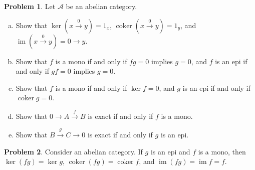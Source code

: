 \documentclass[11pt]{article}
\DeclareMathOperator{\coker}{coker}
\DeclareMathOperator{\im}{im}
\theoremstyle{definition}
\newtheorem{problem}{Problem}
\begin{document}
\vfill

\begin{problem} Let $\mathcal{A}$ be an abelian category.
	\begin{enumerate}[a)]
		\item Show that $\ker(x \xrightarrow{0} y) = 1_x$,  $\coker(x \xrightarrow{0} y) = 1_y$, and $\im(x \xrightarrow{0} y) = 0 \longrightarrow y$.
		\item Show that $f$ is a mono if and only if $fg = 0$ implies $g = 0$, and $f$ is an epi if and only if $gf = 0$ implies $g = 0$.
		\item Show that $f$ is a mono if and only if $\ker f = 0$, and $g$ is an epi if and only if $\coker g = 0$.
		\item Show that $0 \longrightarrow A \xrightarrow{\, f \,} B$ is exact if and only if $f$ is a mono.
		\item Show that $B \xrightarrow{\, g \,} C \longrightarrow 0$ is exact if and only if $g$ is an epi.
	\end{enumerate}
\end{problem}



\vfill

\begin{problem}
Consider an abelian category. If $g$ is an epi and $f$ is a mono, then $\ker (fg) = \ker g$, $\coker(fg) = \coker f$, and $\im (fg) = \im f = f$.
\end{problem}


\newpage


\noindent
{} 

\vspace{1em}
\end{document}
